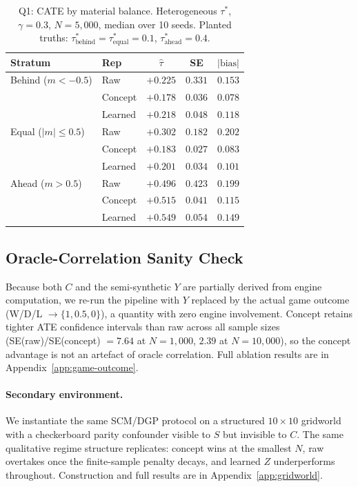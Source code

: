 \documentclass{article}
\begin{document}
\begin{table}[t]
\caption{Q1: CATE by material balance. Heterogeneous $\tau^*$,
$\gamma{=}0.3$, $N{=}5{,}000$, median over 10 seeds. Planted truths:
$\tau^*_{\text{behind}}=\tau^*_{\text{equal}}=0.1$, $\tau^*_{\text{ahead}}=0.4$.}
\label{tab:q1-main}
\centering
\small
\begin{tabular}{llccc}
\toprule
Stratum & Rep & $\hat{\tau}$ & SE & $|\text{bias}|$ \\
\midrule
Behind ($m<-0.5$) & Raw     & $+0.225$ & $0.331$ & $0.153$ \\
                  & Concept & $+0.178$ & $0.036$ & $0.078$ \\
                  & Learned & $+0.218$ & $0.048$ & $0.118$ \\
\midrule
Equal ($|m|\leq0.5$) & Raw     & $+0.302$ & $0.182$ & $0.202$ \\
                     & Concept & $+0.183$ & $0.027$ & $0.083$ \\
                     & Learned & $+0.201$ & $0.034$ & $0.101$ \\
\midrule
Ahead ($m>0.5$) & Raw     & $+0.496$ & $0.423$ & $0.199$ \\
                & Concept & $+0.515$ & $0.041$ & $0.115$ \\
                & Learned & $+0.549$ & $0.054$ & $0.149$ \\
\bottomrule
\end{tabular}
\end{table}

\subsection{Oracle-Correlation Sanity Check}
Because both $C$ and the semi-synthetic $Y$ are partially derived from engine
computation, we re-run the pipeline with $Y$ replaced by the actual game
outcome (W/D/L $\to\{1,0.5,0\}$), a quantity with zero engine involvement.
Concept retains tighter ATE confidence intervals than raw across all sample
sizes (SE(raw)/SE(concept) $=7.64$ at $N{=}1{,}000$, $2.39$ at $N{=}10{,}000$),
so the concept advantage is not an artefact of oracle correlation. Full
ablation results are in Appendix~\ref{app:game-outcome}.

\paragraph{Secondary environment.}
We instantiate the same SCM/DGP protocol on a structured $10\times 10$
gridworld with a checkerboard parity confounder visible to $S$ but invisible
to $C$. The same qualitative regime structure replicates: concept wins at the
smallest $N$, raw overtakes once the finite-sample penalty decays, and learned
$Z$ underperforms throughout. Construction and full results are in
Appendix~\ref{app:gridworld}.
\end{document}
